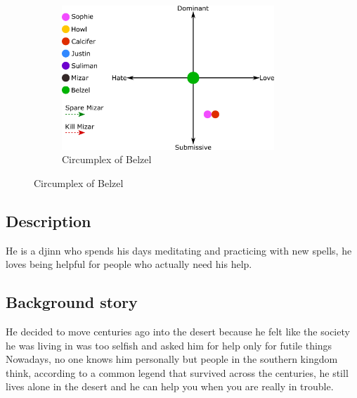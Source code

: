 \begin{figure}
\centering
\begin{subfigure}
  \centering
  \includegraphics[width=8cm]{Images/Circumplexes/belzelCircumplex}
  \caption{Circumplex of Belzel}
\end{subfigure}
\end{figure}

\subsection{Description}
He is a djinn who spends his days meditating and practicing with new spells, he loves being helpful for people who actually need his help. 


\subsection{Background story}
He decided to move centuries ago into the desert because he felt like the society he was living in was too selfish and asked him for help only for futile things 
Nowadays, no one knows him personally but people in the southern kingdom think, according to a common legend that survived across the centuries, he still lives alone in the desert and he can help you when you are really in trouble.



